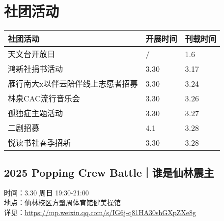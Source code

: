 \documentclass[letterpaper, 12pt]{article}
\begin{document}
\begin{multicols}{2}
\begin{tabular}{|>{\centering\arraybackslash}m{}|m{}|m{}|}
    \hline
\end{tabular}


\section{社团活动}
\begin{tabular}{|>{\centering\arraybackslash}m{}|m{}|m{}|}
    \hline
    社团活动 & 开展时间 & 刊载时间\\
    \hline\hline
    天文台开放日 & / & 1.6\\
    鸿新社捐书活动 & 3.30 & 3.17\\
    雁行南大x以伴云陪伴线上志愿者招募 & 3.30 & 3.24\\
    林泉CAC流行音乐会 & 3.30 & 3.26\\
    孤独症主题活动 & 3.30 & 3.27\\
    二剧招募 & 4.1 & 3.28\\
    悦读书社春季招新 & 3.30 & 3.28\\
    \hline
\end{tabular}
\subsection{2025 Popping Crew Battle｜谁是仙林震主}
时间：3.30 周日 19:30-21:00
\\地点：仙林校区方肇周体育馆健美操馆
\\详见：\url{https://mp.weixin.qq.com/s/IG6j-q81HA30shGXpZXe8g}

\end{multicols}
\end{document}
